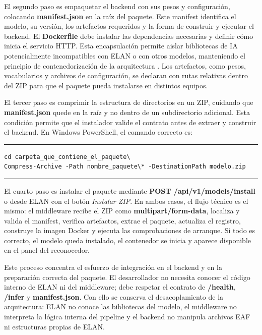 El segundo paso es empaquetar el backend con sus pesos y configuración, colocando \textbf{manifest.json} en la raíz del paquete. Este manifest identifica el modelo, su versión, los artefactos requeridos y la forma de construir y ejecutar el backend. El \textbf{Dockerfile} debe instalar las dependencias necesarias y definir cómo inicia el servicio HTTP. Esta encapsulación permite aislar bibliotecas de IA potencialmente incompatibles con ELAN o con otros modelos, manteniendo el principio de contenedorización de la arquitectura \cite{docker2026overview}. Los artefactos, como pesos, vocabularios y archivos de configuración, se declaran con rutas relativas dentro del ZIP para que el paquete pueda instalarse en distintos equipos.

El tercer paso es comprimir la estructura de directorios en un ZIP, cuidando que \textbf{manifest.json} quede en la raíz y no dentro de un subdirectorio adicional. Esta condición permite que el instalador valide el contrato antes de extraer y construir el backend. En Windows PowerShell, el comando correcto es:

\begin{center}
\begin{minipage}{0.78\textwidth}
\hrule
\vspace{0.08cm}
\footnotesize
\begin{Verbatim}[baselinestretch=0.78]
cd carpeta_que_contiene_el_paquete\
Compress-Archive -Path nombre_paquete\* -DestinationPath modelo.zip
\end{Verbatim}
\vspace{0.03cm}
\hrule

\label{lst:comprimir_modelo_zip}
\end{minipage}
\end{center}

El cuarto paso es instalar el paquete mediante \textbf{POST /api/v1/models/install} o desde ELAN con el botón \textit{Instalar ZIP}. En ambos casos, el flujo técnico es el mismo: el middleware recibe el ZIP como \textbf{multipart/form-data}, localiza y valida el manifest, verifica artefactos, extrae el paquete, actualiza el registro, construye la imagen Docker y ejecuta las comprobaciones de arranque. Si todo es correcto, el modelo queda instalado, el contenedor se inicia y aparece disponible en el panel del reconocedor.

Este proceso concentra el esfuerzo de integración en el backend y en la preparación correcta del paquete. El desarrollador no necesita conocer el código interno de ELAN ni del middleware; debe respetar el contrato de \textbf{/health}, \textbf{/infer} y \textbf{manifest.json}. Con ello se conserva el desacoplamiento de la arquitectura: ELAN no conoce las bibliotecas del modelo, el middleware no interpreta la lógica interna del pipeline y el backend no manipula archivos EAF ni estructuras propias de ELAN.

